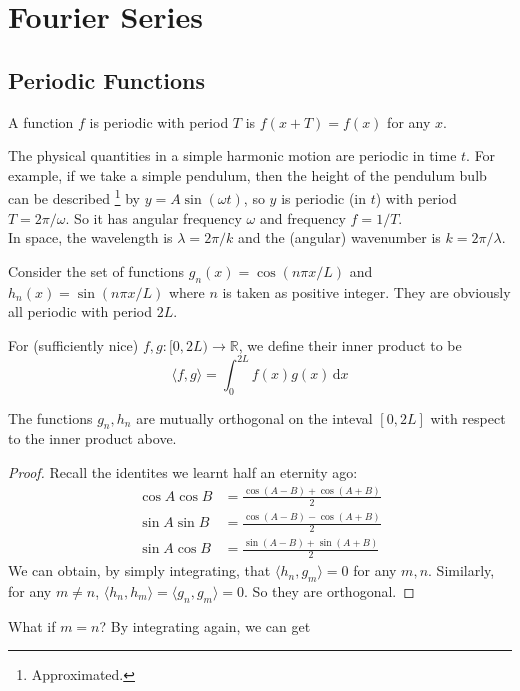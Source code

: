 \section{Fourier Series}
\subsection{Periodic Functions}
\begin{definition}
    A function $f$ is periodic with period $T$ is $f(x+T)=f(x)$ for any $x$.
\end{definition}
\begin{example}
    The physical quantities in a simple harmonic motion are periodic in time $t$.
    For example, if we take a simple pendulum, then the height of the pendulum bulb can be described
    \footnote{Approximated.}
    by $y=A\sin(\omega t)$, so $y$ is periodic (in $t$) with period $T=2\pi/\omega$.
    So it has angular frequency $\omega$ and frequency $f=1/T$.\\
    In space, the wavelength is $\lambda=2\pi/k$ and the (angular) wavenumber is $k=2\pi/\lambda$.
\end{example}
Consider the set of functions $g_n(x)=\cos(n\pi x/L)$ and $h_n(x)=\sin(n\pi x/L)$ where $n$ is taken as positive integer.
They are obviously all periodic with period $2L$.
\begin{definition}
    For (sufficiently nice) $f,g:[0,2L)\to\mathbb R$, we define their inner product to be
    $$\langle f,g\rangle =\int_0^{2L}f(x)g(x)\,\mathrm dx$$
\end{definition}
\begin{proposition}
    The functions $g_n,h_n$ are mutually orthogonal on the inteval $[0,2L]$ with respect to the inner product above.
\end{proposition}
\begin{proof}
    Recall the identites we learnt half an eternity ago:
    \begin{align*}
        \cos A\cos B&=\frac{\cos(A-B)+\cos(A+B)}{2}\\
        \sin A\sin B&=\frac{\cos(A-B)-\cos(A+B)}{2}\\
        \sin A\cos B&=\frac{\sin(A-B)+\sin(A+B)}{2}
    \end{align*}
    We can obtain, by simply integrating, that $\langle h_n,g_m\rangle=0$ for any $m,n$.
    Similarly, for any $m\neq n$, $\langle h_n,h_m\rangle=\langle g_n,g_m\rangle=0$.
    So they are orthogonal.
\end{proof}
What if $m=n$?
By integrating again, we can get
